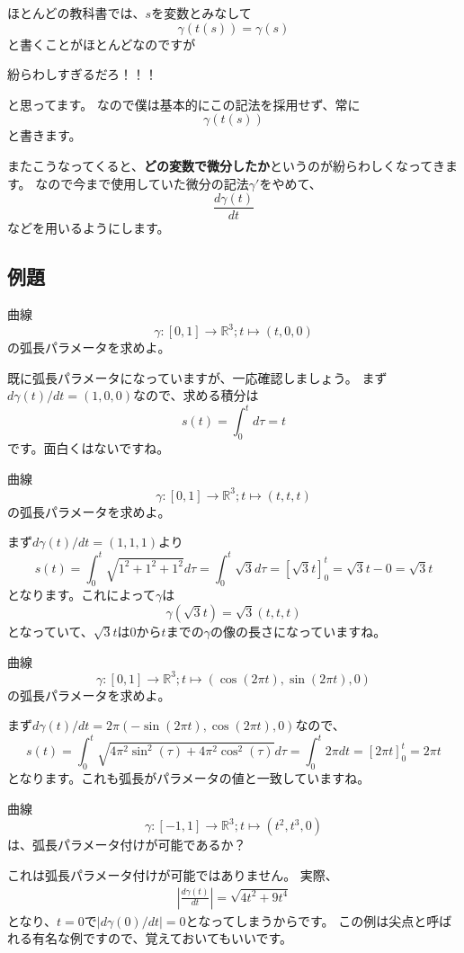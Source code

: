 ほとんどの教科書では、$s$を変数とみなして
\[
  \gamma(t(s))=\gamma(s)
\]
と書くことがほとんどなのですが
\begin{center}
  \Huge{
    紛らわしすぎるだろ！！！
  }
\end{center}
と思ってます。
なので僕は基本的にこの記法を採用せず、常に
\[
  \gamma(t(s))
\]
と書きます。

またこうなってくると、\textbf{どの変数で微分したか}というのが紛らわしくなってきます。
なので今まで使用していた微分の記法$\gamma'$をやめて、
\[
  \frac{d\gamma(t)}{dt}
\]
などを用いるようにします。

\subsection{例題}

\begin{example}
  曲線
  \[
    \gamma:[0,1]\to\mathbb{R}^3;t\mapsto(t,0,0)
  \]
  の弧長パラメータを求めよ。
\end{example}
既に弧長パラメータになっていますが、一応確認しましょう。
まず$d\gamma(t)/dt=(1,0,0)$なので、求める積分は
\[
  s(t)=\int_0^td\tau=t
\]
です。面白くはないですね。

\begin{example}
  曲線
  \[
    \gamma:[0,1]\to\mathbb{R}^3;t\mapsto(t,t,t)
  \]
  の弧長パラメータを求めよ。
\end{example}
まず$d\gamma(t)/dt=(1,1,1)$より
\[
  s(t)=\int_0^t\sqrt{1^2+1^2+1^2}d\tau=\int_0^t\sqrt{3}d\tau=[\sqrt{3}t]_0^t=\sqrt{3}t-0=\sqrt{3}t
\]
となります。これによって$\gamma$は
\[
  \gamma(\sqrt{3}t)=\sqrt{3}(t,t,t)
\]
となっていて、$\sqrt{3}t$は$0$から$t$までの$\gamma$の像の長さになっていますね。

\begin{example}
  曲線
  \[
    \gamma:[0,1]\to\mathbb{R}^3;t\mapsto(\cos(2\pi t),\sin(2\pi t),0)
  \]
  の弧長パラメータを求めよ。
\end{example}
まず$d\gamma(t)/dt=2\pi(-\sin(2\pi t),\cos(2\pi t),0)$なので、
\[
  s(t)=\int_0^t\sqrt{4\pi^2\sin^2(\tau)+4\pi^2\cos^2(\tau)}d\tau=\int_0^t2\pi dt=[2\pi t]_0^t=2\pi t
\]
となります。これも弧長がパラメータの値と一致していますね。

\begin{example}
  曲線
  \[
    \gamma:[-1,1]\to\mathbb{R}^3;t\mapsto(t^2,t^3,0)
  \]
  は、弧長パラメータ付けが可能であるか？
\end{example}
これは弧長パラメータ付けが可能ではありません。
実際、
\begin{align*}
  \left|\frac{d\gamma(t)}{dt}\right|=\sqrt{4t^2+9t^4}
\end{align*}
となり、$t=0$で$|d\gamma(0)/dt|=0$となってしまうからです。
この例は尖点と呼ばれる有名な例ですので、覚えておいてもいいです。

